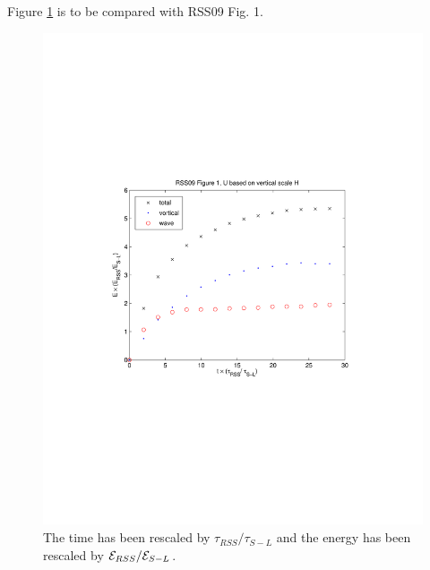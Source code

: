 \documentclass[12pt]{article}
\begin{document}
Figure \ref{Fig1_H} is to be compared with RSS09 Fig. 1. 
\begin{figure}[ht]
\centering
\includegraphics[scale = .7]{RSS09_Fig1_UH}
\caption{The time has been rescaled by $\tau_{RSS}/\tau_{S-L}$ and the energy has been rescaled by ${\cal E}_{RSS}/{\cal E}_{S-L}$. }
\label{Fig1_H}
\end{figure}
\end{document}

